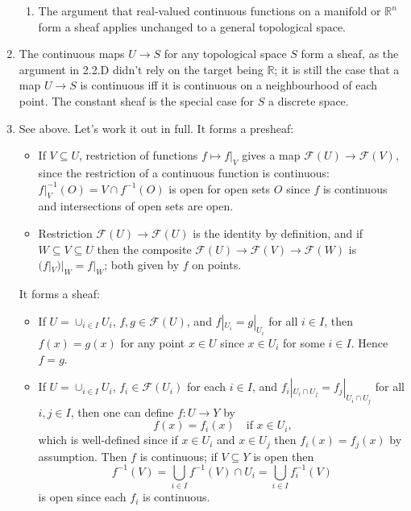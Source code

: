 \documentclass{report}
\newcommand{\scrF}{\mathscr{F}}
\newcommand{\R}{\mathbb{R}}
\begin{document}
\begin{enumerate}[label=\textbf{2.2.\Alph*.}]
\begin{enumerate}[label=(\alph*)]
		      \item The argument that real-valued continuous functions on a
		            manifold or $\R^n$ form a sheaf applies unchanged to a general
		            topological space.
	      \end{enumerate}

	\item The continuous maps $U\to S$ for any topological space $S$ form a
	      sheaf, as the argument in 2.2.D didn't rely on the target being $\R$;
	      it is still the case that a map $U\to S$ is continuous iff it is
	      continuous on a neighbourhood of each point. The constant sheaf is the
	      special case for $S$ a discrete space.

	\item See above. Let's work it out in full. It forms a presheaf:
	      \begin{itemize}
		      \item If $V\subseteq U$, restriction of functions $f\mapsto f|_V$
		            gives a map $\scrF(U)\to\scrF(V)$, since the restriction of a
		            continuous function is continuous: $f|_V^{-1}(O)=V\cap f^{-1}(O)$
		            is open for open sets $O$ since $f$ is continuous and
		            intersections of open sets are open.

		      \item Restriction $\scrF(U)\to\scrF(U)$ is the identity by definition, and
		            if $W\subseteq V\subseteq U$ then the composite
		            $\scrF(U)\to\scrF(V)\to\scrF(W)$ is $(f|_V)|_W=f|_W$; both given by
		            $f$ on points.
	      \end{itemize}
	      It forms a sheaf:
	      \begin{itemize}
		      \item If $U=\cup_{i\in I}U_i$, $f,g\in\scrF(U)$, and $f|_{U_i}=g|_{U_i}$
		            for all $i\in I$, then $f(x)=g(x)$ for any point $x\in U$ since
		            $x\in U_i$ for some $i\in I$. Hence $f=g$.

		      \item If $U=\cup_{i\in I}U_i$, $f_i\in\scrF(U_i)$ for each $i\in I$,
		            and $f_i|_{U_i\cap U_j}=f_j|_{U_i\cap U_j}$ for all $i,j\in I$,
		            then one can define $f:U\to Y$ by
		            \begin{equation*}
			            f(x) = f_i(x) \quad \text{if $x\in U_i$,}
		            \end{equation*}
		            which is well-defined since if $x\in U_i$ and $x\in U_j$ then
		            $f_i(x)=f_j(x)$ by assumption. Then $f$ is continuous; if
		            $V\subseteq Y$ is open then
		            \begin{equation*}
			            f^{-1}(V)
			            = \bigcup_{i\in I}f^{-1}(V)\cap U_i
			            = \bigcup_{i\in I}f_i^{-1}(V)
		            \end{equation*}
		            is open since each $f_i$ is continuous.
	      \end{itemize}


\end{enumerate}
\end{document}
